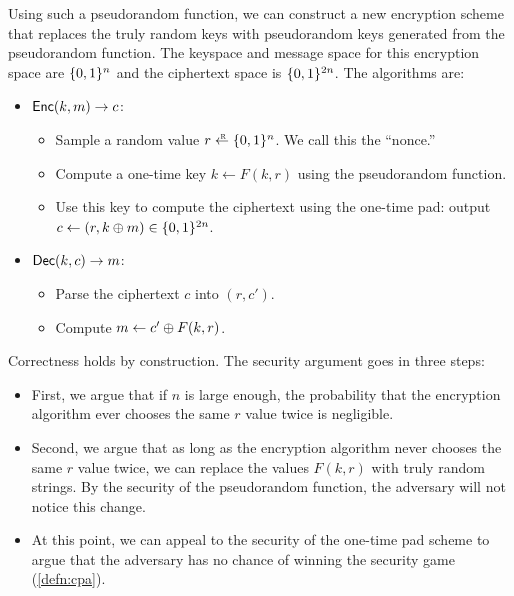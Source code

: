 Using such a pseudorandom function, we can construct a new 
encryption scheme that replaces the truly random keys 
with pseudorandom keys generated from the pseudorandom function.
The keyspace and message space for this encryption space are $\{0,1\}^n$
and the ciphertext space is $\{0,1\}^{2n}$.
The algorithms are:
\begin{itemize}
	\item $\mathsf{Enc}(k, m) \to c$:
      \begin{itemize}
        \item Sample a random value $r \rgets \bin^n$.
              We call this the ``nonce.''
        \item Compute a one-time key $k \gets F(k, r)$ using the pseudorandom function.
        \item Use this key to compute the ciphertext using the one-time pad: 
          output $c \gets (r, k \oplus m) \in \{0,1\}^{2n}$.
      \end{itemize}
	\item $\mathsf{Dec}(k, c) \to m$:
        \begin{itemize}
          \item Parse the ciphertext $c$ into $(r, c')$.
          \item Compute $m \gets c' \oplus F(k, r)$.
        \end{itemize}
\end{itemize}

Correctness holds by construction.
The security argument goes in three steps:
\begin{itemize}
  \item First, we argue that if $n$ is large enough, the probability 
        that the encryption algorithm ever chooses the same $r$ value twice
        is negligible.
  \item Second, we argue that as long as the encryption algorithm
        never chooses the same $r$ value twice, 
        we can replace the values $F(k, r)$ with truly random strings.
        By the security of the pseudorandom function, the adversary will
        not notice this change.
  \item At this point, we can appeal to the security of the one-time pad scheme
        to argue that the adversary has no chance of winning the security 
        game (\cref{defn:cpa}).
\end{itemize}

